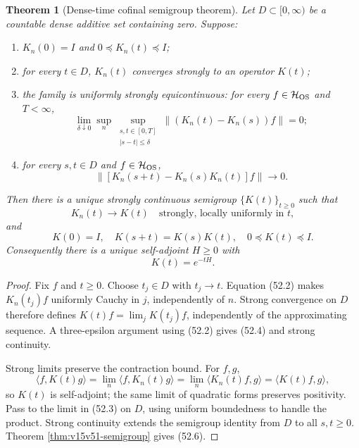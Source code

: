 \documentclass[11pt]{article}
\newtheorem{theorem}{Theorem}[section]
\theoremstyle{remark}
\begin{document}
\begin{theorem}[Dense-time cofinal semigroup theorem]
\label{thm:v15v52-semigroup}
Let \(D\subset[0,\infty)\) be a countable dense additive set
containing zero.  Suppose:
\begin{enumerate}
\item \(K_n(0)=I\) and \(0\preceq K_n(t)\preceq I\);
\item for every \(t\in D\), \(K_n(t)\) converges strongly to an
      operator \(K(t)\);
\item the family is uniformly strongly equicontinuous: for every
      \(f\in{\cal H}_{\rm OS}\) and \(T<\infty\),
      \[
       \lim_{\delta\downarrow0}
       \sup_n\sup_{\substack{s,t\in[0,T]\\|s-t|\leq\delta}}
       \|(K_n(t)-K_n(s))f\|=0;                           \tag{52.2}
      \]
\item for every \(s,t\in D\) and \(f\in{\cal H}_{\rm OS}\),
      \[
       \|[K_n(s+t)-K_n(s)K_n(t)]f\|\longrightarrow0.     \tag{52.3}
      \]
\end{enumerate}
Then there is a unique strongly continuous semigroup
\(\{K(t)\}_{t\geq0}\) such that
\[
 K_n(t)\longrightarrow K(t)
 \quad\text{strongly, locally uniformly in \(t\)},       \tag{52.4}
\]
and
\[
 K(0)=I,\quad K(s+t)=K(s)K(t),\quad
 0\preceq K(t)\preceq I.                                \tag{52.5}
\]
Consequently there is a unique self-adjoint \(H\geq0\) with
\[
 K(t)=e^{-tH}.                                          \tag{52.6}
\]
\end{theorem}

\begin{proof}
Fix \(f\) and \(t\geq0\).  Choose \(t_j\in D\) with \(t_j\to t\).
Equation (52.2) makes \(K_n(t_j)f\) uniformly Cauchy in \(j\),
independently of \(n\).  Strong convergence on \(D\) therefore
defines \(K(t)f=\lim_jK(t_j)f\), independently of the approximating
sequence.  A three-epsilon argument using (52.2) gives (52.4) and
strong continuity.

Strong limits preserve the contraction bound.  For \(f,g\),
\[
 \langle f,K(t)g\rangle
 =\lim_n\langle f,K_n(t)g\rangle
 =\lim_n\langle K_n(t)f,g\rangle
 =\langle K(t)f,g\rangle,
\]
so \(K(t)\) is self-adjoint; the same limit of quadratic forms
preserves positivity.  Pass to the limit in (52.3) on \(D\), using
uniform boundedness to handle the product.  Strong continuity
extends the semigroup identity from \(D\) to all \(s,t\geq0\).
Theorem \ref{thm:v15v51-semigroup} gives (52.6).
\end{proof}
\end{document}

